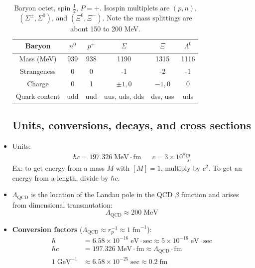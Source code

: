 \documentclass[11pt, oneside]{article}   	%
\theoremstyle{definition}
\numberwithin{equation}{subsection}		%
\begin{document}
\begin{itemize}
	\begin{table}[H]
	\centering
	\begin{tabular}{ | c | c | c | c | c | c | }
		\hline
		Baryon & $n^0$ & $p^+$ & $\Sigma$ & $\Xi$ & $\Lambda^0$ \\
		\hline
		Mass (MeV) & 939 & 938 & 1190 & 1315 & 1116  \\
		\hline
		Strangeness & 0 & 0 & -1 & -2 & -1 \\
		\hline
		Charge & 0 & 1 & $\pm 1, 0$ & $-1, 0$ & 0 \\
		\hline
		Quark content & udd & uud & uus, uds, dds & dss, uss & uds \\
		\hline
	\end{tabular}
	\caption{Baryon octet, spin $\frac{1}{2}$, $P = +$. Isospin multiplets are $(p, n)$, $(\Sigma^\pm, \Sigma^0)$, and $(\Xi^0, \Xi^-)$. Note the 
	mass splittings are about 150 to 200 MeV.}
	\label{table:baryon_octet}
	\end{table}
	
	
	
	
	
	\newpage
	\subsection{Units, conversions, decays, and cross sections}
	\item Units:
	\begin{align}
		\hbar c = 197.326 \;\mathrm{MeV} \cdot \mathrm{fm} && c = 3\times 10^8 \frac{m}{s}
	\end{align}
	Ex: to get energy from a mass $M$ with $[M] = 1$, multiply by $c^2$. To get an energy from a length, divide by $\hbar c$. 
	\item $\Lambda_\mathrm{QCD}$ is the location of the Landau pole in the QCD $\beta$ function and arises from dimensional 
	transmutation:
	\begin{equation}
		\Lambda_\mathrm{QCD}\approx 200\;\mathrm{MeV}
	\end{equation}
	\item \textbf{Conversion factors} ($\Lambda_\mathrm{QCD}\approx r_p^{-1}\approx 1 \;\mathrm{fm}^{-1}$):
	\begin{align}
		\hbar &= 6.58\times 10^{-16} \;\mathrm{eV}\cdot\mathrm{sec} \approx 5\times 10^{-16} \;\mathrm{eV}\cdot\mathrm{sec} \\
		\hbar c &= 197.326 \;\mathrm{MeV} \cdot \mathrm{fm}\approx \Lambda_\mathrm{QCD}\cdot\mathrm{fm} \\
		1 \;\mathrm{GeV}^{-1} &\approx 6.58\times 10^{-25}\;\mathrm{sec}\approx 0.2 \;\mathrm{fm}
	\end{align}
	

\end{itemize}
\end{document}
